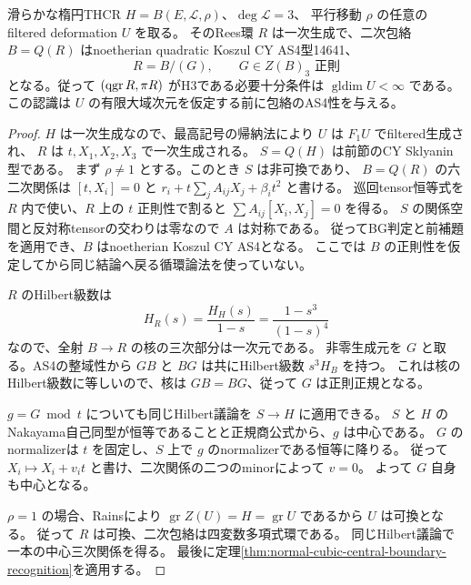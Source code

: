 \begin{theorem}
\label{thm:all-filtered-elliptic-strong-envelope}
滑らかな楕円THCR $H=B(E,\mathcal L,\rho)$、$\deg\mathcal L=3$、
平行移動 $\rho$ の任意のfiltered deformation $U$ を取る。
そのRees環 $R$ は一次生成で、二次包絡 $B=Q(R)$ はnoetherian quadratic Koszul CY AS4型14641、
\[
 R=B/(G),\qquad G\in Z(B)_3\text{ 正則}
\]
となる。従って $(\operatorname{qgr} R,\pi R)$ がH3である必要十分条件は
$\operatorname{gldim}U<\infty$ である。
この認識は $U$ の有限大域次元を仮定する前に包絡のAS4性を与える。
\end{theorem}
\begin{proof}
$H$ は一次生成なので、最高記号の帰納法により $U$ は $F_1U$ でfiltered生成され、
$R$ は $t,X_1,X_2,X_3$ で一次生成される。
$S=Q(H)$ は前節のCY Sklyanin型である。
まず $\rho\ne1$ とする。このとき $S$ は非可換であり、
$B=Q(R)$ の六二次関係は $[t,X_i]=0$ と
$r_i+t\sum_jA_{ij}X_j+\beta_i t^2$ と書ける。
巡回tensor恒等式を $R$ 内で使い、$R$ 上の $t$ 正則性で割ると
$\sum A_{ij}[X_i,X_j]=0$ を得る。
$S$ の関係空間と反対称tensorの交わりは零なので $A$ は対称である。
従ってBG判定と前補題を適用でき、$B$ はnoetherian Koszul CY AS4となる。
ここでは $B$ の正則性を仮定してから同じ結論へ戻る循環論法を使っていない。

$R$ のHilbert級数は
\[
 H_R(s)=\frac{H_H(s)}{1-s}=\frac{1-s^3}{(1-s)^4}
\]
なので、全射 $B\to R$ の核の三次部分は一次元である。
非零生成元を $G$ と取る。AS4の整域性から $GB$ と $BG$ は共にHilbert級数 $s^3H_B$ を持つ。
これは核のHilbert級数に等しいので、核は $GB=BG$、従って $G$ は正則正規となる。

$g=G\bmod t$ についても同じHilbert議論を $S\to H$ に適用できる。
$S$ と $H$ のNakayama自己同型が恒等であることと正規商公式から、$g$ は中心である。
$G$ のnormalizerは $t$ を固定し、$S$ 上で $g$ のnormalizerである恒等に降りる。
従って $X_i\mapsto X_i+v_i t$ と書け、二次関係の二つのminorによって $v=0$。
よって $G$ 自身も中心となる。

$\rho=1$ の場合、Rains\cite[Theorem 2.13]{RainsCut}により
$\operatorname{gr}Z(U)=H=\operatorname{gr}U$ であるから $U$ は可換となる。
従って $R$ は可換、二次包絡は四変数多項式環である。
同じHilbert議論で一本の中心三次関係を得る。
最後に定理\ref{thm:normal-cubic-central-boundary-recognition}を適用する。
\end{proof}

